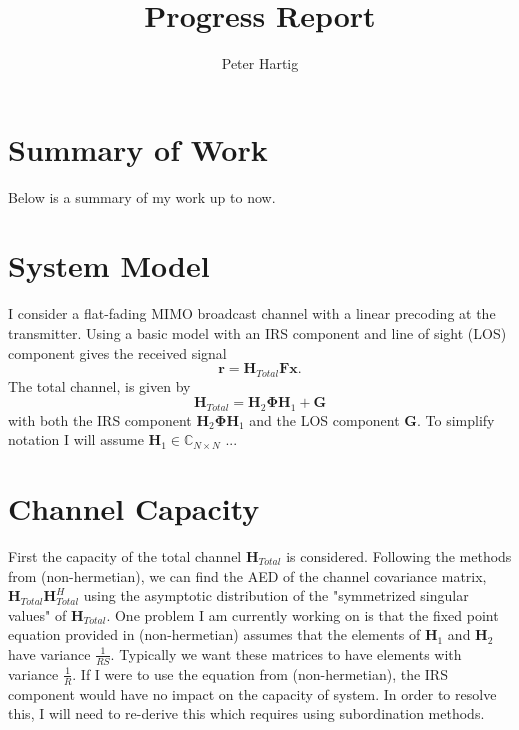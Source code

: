 \documentclass[12pt,a4paper]{report}
\title{Progress Report}
\author{Peter Hartig}
\begin{document}
\maketitle
\tableofcontents


\section{Summary of Work}
Below is a summary of my work up to now.
\section{System Model}
I consider a flat-fading MIMO broadcast channel with a linear precoding at the transmitter. 
Using a basic model with an IRS component and line of sight (LOS) component gives the received signal 
	 \begin{equation}
		\mathbf{r} = \mathbf{H}_{Total}\mathbf{F}\mathbf{x}.
	\end{equation}
	The total channel, is given by
	\begin{equation}
	\mathbf{H}_{Total} =  \mathbf{H}_{2}\boldsymbol{\Phi}\mathbf{H}_{1} + \mathbf{G}
	\end{equation}
	with both the IRS component $ \mathbf{H}_{2}\boldsymbol{\Phi}\mathbf{H}_{1}$ and 
	the LOS component $\mathbf{G}$. To simplify notation I will assume 
	$\mathbf{H}_{1} \in \mathbb{C}_{N \times N}$ ...

\section{Channel Capacity}
First the capacity of the total channel $\mathbf{H}_{Total}$ is considered. 
Following the methods from (non-hermetian), we can find the AED of the channel 
covariance matrix, $\mathbf{H}_{Total}\mathbf{H}_{Total}^H$ using the asymptotic distribution of the "symmetrized singular values" of $\mathbf{H}_{Total}$.
One problem I am currently working on is that the fixed point equation  provided in (non-hermetian) assumes that the
 elements of $ \mathbf{H}_{1}$ and  $\mathbf{H}_{2}$ have variance $\frac{1}{RS}$. Typically we want these
  matrices to have elements with variance $\frac{1}{R}$.
  If I were to use the equation from (non-hermetian), the IRS component would have no impact on the capacity of system. In order to resolve this, I will need to re-derive this which requires using subordination methods. 
\end{document}
